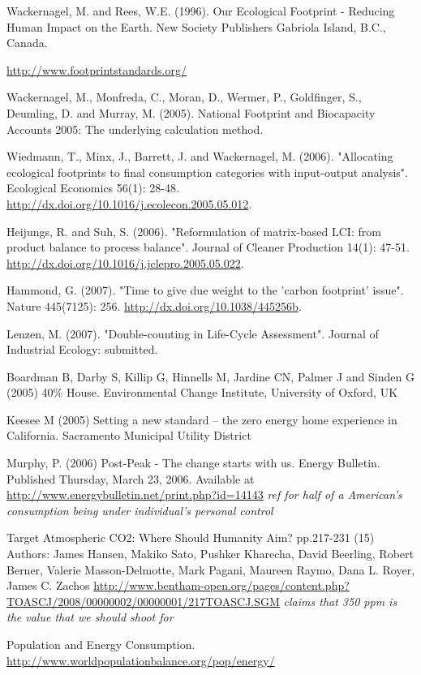 Wackernagel, M. and Rees, W.E. (1996). Our Ecological Footprint - Reducing Human Impact on the Earth. New Society Publishers Gabriola Island, B.C., Canada.

\url{http://www.footprintstandards.org/}

Wackernagel, M., Monfreda, C., Moran, D., Wermer, P., Goldfinger, S., Deumling, D. and Murray, M. (2005). National Footprint and Biocapacity Accounts 2005: The underlying calculation method.

Wiedmann, T., Minx, J., Barrett, J. and Wackernagel, M. (2006). "Allocating ecological footprints to final consumption categories with input-output analysis". Ecological Economics 56(1): 28-48. \url{http://dx.doi.org/10.1016/j.ecolecon.2005.05.012}.

Heijungs, R. and Suh, S. (2006). "Reformulation of matrix-based LCI: from product balance to process balance". Journal of Cleaner Production 14(1): 47-51. 
\url{http://dx.doi.org/10.1016/j.jclepro.2005.05.022}.

Hammond, G. (2007). "Time to give due weight to the 'carbon footprint' issue". Nature 445(7125): 256. \url{http://dx.doi.org/10.1038/445256b}.

Lenzen, M. (2007). "Double-counting in Life-Cycle Assessment". Journal of Industrial Ecology: submitted.

Boardman B, Darby S, Killip G, Hinnells M, Jardine CN, Palmer J and Sinden G (2005) 40\% House. Environmental Change Institute, University of Oxford, UK

Keesee M (2005) Setting a new standard – the zero energy home experience in California. Sacramento Municipal Utility District

Murphy, P. (2006) Post-Peak - The change starts with us. Energy Bulletin. Published Thursday, March 23, 2006. Available at \url{http://www.energybulletin.net/print.php?id=14143} \emph{ref for half of a American's consumption being under individual's personal control}

Target Atmospheric CO2: Where Should Humanity Aim? pp.217-231 (15) Authors: James Hansen, Makiko Sato, Pushker Kharecha, David Beerling, Robert Berner, Valerie Masson-Delmotte, Mark Pagani, Maureen Raymo, Dana L. Royer, James C. Zachos \url{http://www.bentham-open.org/pages/content.php?TOASCJ/2008/00000002/00000001/217TOASCJ.SGM} \emph{claims that 350 ppm is the \COtwo value that we should shoot for}

Population and Energy Consumption. \url{http://www.worldpopulationbalance.org/pop/energy/}

